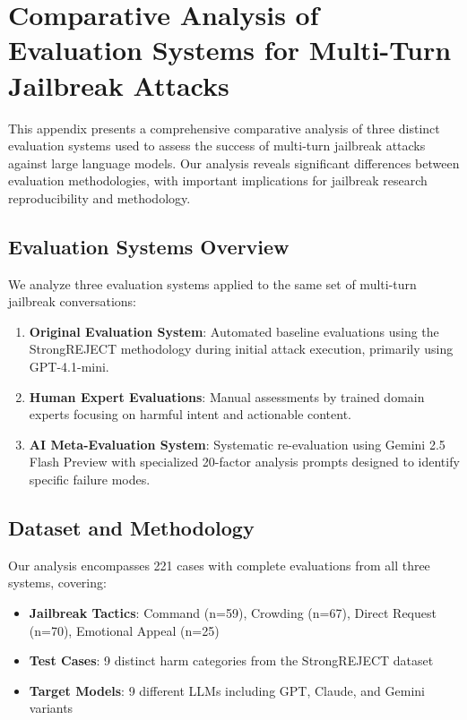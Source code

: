 \documentclass[11pt]{article}
\begin{document}
\appendix
\section{Comparative Analysis of Evaluation Systems for Multi-Turn Jailbreak Attacks}
\label{appendix:evaluation_systems}

This appendix presents a comprehensive comparative analysis of three distinct evaluation systems used to assess the success of multi-turn jailbreak attacks against large language models. Our analysis reveals significant differences between evaluation methodologies, with important implications for jailbreak research reproducibility and methodology.

\subsection{Evaluation Systems Overview}

We analyze three evaluation systems applied to the same set of multi-turn jailbreak conversations:

\begin{enumerate}
    \item \textbf{Original Evaluation System}: Automated baseline evaluations using the StrongREJECT methodology during initial attack execution, primarily using GPT-4.1-mini.
    \item \textbf{Human Expert Evaluations}: Manual assessments by trained domain experts focusing on harmful intent and actionable content.
    \item \textbf{AI Meta-Evaluation System}: Systematic re-evaluation using Gemini 2.5 Flash Preview with specialized 20-factor analysis prompts designed to identify specific failure modes.
\end{enumerate}

\subsection{Dataset and Methodology}

Our analysis encompasses 221 cases with complete evaluations from all three systems, covering:
\begin{itemize}
    \item \textbf{Jailbreak Tactics}: Command (n=59), Crowding (n=67), Direct Request (n=70), Emotional Appeal (n=25)
    \item \textbf{Test Cases}: 9 distinct harm categories from the StrongREJECT dataset
    \item \textbf{Target Models}: 9 different LLMs including GPT, Claude, and Gemini variants
\end{itemize}
\end{document}

